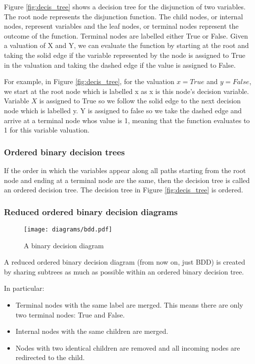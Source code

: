 Figure \ref{fig:decis_tree} shows a decision tree for the disjunction of two variables. The root node represents the disjunction function. The child nodes, or internal nodes, represent variables and the leaf nodes, or terminal nodes represent the outcome of the function. Terminal nodes are labelled either True or False. Given a valuation of X and Y, we can evaluate the function by starting at the root and taking the solid edge if the variable represented by the node is assigned to True in the valuation and taking the dashed edge if the value is assigned to False. 

For example, in Figure \ref{fig:decis_tree}, for the valuation $x=True$ and $y=False$, we start at the root node which is labelled x as x is this node's decision variable. Variable $X$ is assigned to True so we follow the solid edge to the next decision node which is labelled y. Y is assigned to false so we take the dashed edge and arrive at a terminal node whos value is 1, meaning that the function evaluates to 1 for this variable valuation.

\subsubsection{Ordered binary decision trees}

If the order in which the variables appear along all paths starting from the root node and ending at a terminal node are the same, then the decision tree is called an ordered decision tree. The decision tree in Figure \ref{fig:decis_tree} is ordered.

\subsubsection{Reduced ordered binary decision diagrams}

\begin{figure}[t]
\centering
\texttt{[image: diagrams/bdd.pdf]}
\caption{A binary decision diagram}
\label{fig:bdd}
\end{figure}

A reduced ordered binary decision diagram (from now on, just BDD) is created by sharing subtrees as much as possible within an ordered binary decision tree.

In particular: 
\begin{itemize}
    \item Terminal nodes with the same label are merged. This means there are only two terminal nodes: True and False.
    \item Internal nodes with the same children are merged.
    \item Nodes with two identical children are removed and all incoming nodes are redirected to the child.
\end{itemize}

